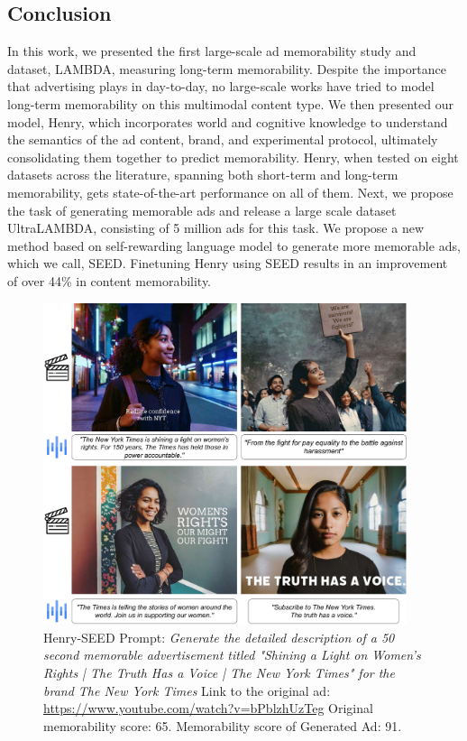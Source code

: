 \subsection{Conclusion}
\label{sec:Conclusion}
In this work, we presented the first large-scale ad memorability study and dataset, LAMBDA, measuring long-term memorability. Despite the importance that advertising plays in day-to-day, no large-scale works have tried to model long-term memorability on this multimodal content type. We then presented our model, Henry, which incorporates world and cognitive knowledge to understand the semantics of the ad content, brand, and experimental protocol, ultimately consolidating them together to predict memorability. Henry, when tested on eight datasets across the literature, spanning both short-term and long-term memorability, gets state-of-the-art performance on all of them. Next, we propose the task of generating memorable ads and release a large scale dataset UltraLAMBDA, consisting of 5 million ads for this task. We propose a new method based on self-rewarding language model to generate more memorable ads, which we call, SEED. Finetuning Henry using SEED results in an improvement of over 44\% in content memorability.


\begin{figure}[]
    \centering
    \includegraphics[width=0.95\textwidth]{images/henry/Henry-NYT.drawio_compressed.pdf}
    \caption{Henry-SEED Prompt: \textit{Generate the detailed description of a 50 second memorable advertisement titled "Shining a Light on Women’s Rights | The Truth Has a Voice | The New York Times" for the brand The New York Times} Link to the original ad: \url{https://www.youtube.com/watch?v=bPblzhUzTeg} Original memorability score: 65. Memorability score of Generated Ad: 91.}
    \label{fig:adgen-NYT}
\end{figure}

